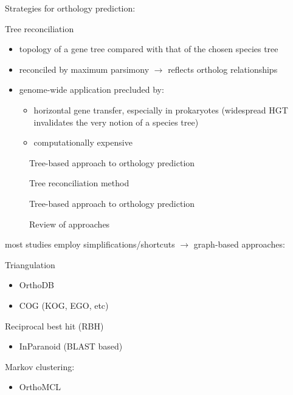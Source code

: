 Strategies for orthology prediction:

Tree reconciliation

\begin{itemize}
	\item topology of a gene tree compared with that of the chosen species tree
	\item reconciled by maximum parsimony $\rightarrow$ reflects ortholog
		relationships
	\item genome-wide application precluded by:
	\begin{itemize}
		\item horizontal gene transfer, especially in prokaryotes (widespread HGT
			invalidates the very notion of a species tree)
		\item computationally expensive
	\end{itemize}
\end{itemize}

\begin{description}
	\item[\cite{mirkin1995}] Tree-based approach to orthology prediction
	\item[\cite{page1998}] Tree reconciliation method
	\item[\cite{yuan1998}] Tree-based approach to orthology prediction
	\item[\cite{kuzniar2008}] Review of approaches
\end{description}

most studies employ simplifications/shortcuts $\rightarrow$ graph-based approaches:

Triangulation

\begin{itemize}
	\item OrthoDB 
	\item COG (KOG, EGO, etc)
\end{itemize}

Reciprocal best hit (RBH) 

\begin{itemize}
	\item InParanoid (BLAST based)
\end{itemize}

Markov clustering:

\begin{itemize}
	\item OrthoMCL
\end{itemize}

